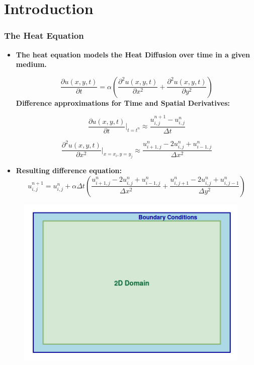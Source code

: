 \documentclass[9pt]{beamer}
\begin{document}
\section{Introduction} %
\begin{frame}
\vspace{-0.1\baselineskip} %

\frametitle{The Heat Equation}
\scriptsize
\begin{itemize}
    \item \textbf{The heat equation models the Heat Diffusion over time in a given medium.}
    
    \[
    \frac{\partial u(x, y, t)}{\partial t} = \alpha \left( \frac{\partial^2 u(x, y, t)}{\partial x^2} + \frac{\partial^2 u(x, y, t)}{\partial y^2} \right)
    \]
\textbf{Difference approximations for Time and Spatial Derivatives:}
\begin{minipage}{0.45\textwidth}

     \[
\frac{\partial u(x, y, t)}{\partial t}\Bigg|_{t = t^n} \approx \frac{u_{i,j}^{n+1} - u_{i,j}^n}{\Delta t}
\]
\end{minipage}
\begin{minipage}{0.45\textwidth}

\[
\frac{\partial^2 u(x, y, t)}{\partial x^2}\Bigg|_{x = x_i, y = y_j} \approx \frac{u_{i+1,j}^n - 2u_{i,j}^n + u_{i-1,j}^n}{\Delta x^2}
\]
\end{minipage}
\item \textbf{Resulting difference equation:}
\[
u_{i,j}^{n+1} = u_{i,j}^n + \alpha \Delta t \left( \frac{u_{i+1,j}^n - 2u_{i,j}^n + u_{i-1,j}^n}{\Delta x^2} + \frac{u_{i,j+1}^n - 2u_{i,j}^n + u_{i,j-1}^n}{\Delta y^2} \right)
\]
\end{itemize}
\vspace{-0.3\baselineskip}
\begin{figure}
    \centering
    \includegraphics[width=0.45\linewidth,height=0.35\linewidth]{Screenshot from 2024-08-30 14-04-56.png}
\end{figure}
\end{frame}
\end{document}
